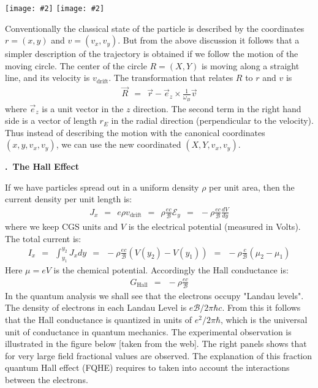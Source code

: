 \documentclass[onecolumn,fleqn, 11pt]{revtex4}
\newcommand{\putgraphv}[2][0.30\hsize]{\texttt{[image: \#2]}}
\newcommand{\beq}{\begin{eqnarray}}
\newcommand{\eeq}{\end{eqnarray}}
\renewcommand{\thesubsection}{\arabic{subsection}}
\renewcommand{\thesubsubsection}{\arabic{subsubsection}}
\newcommand{\sheadC}[1]
{
\addtocounter{subsubsection}{1}
\vspace{5mm}
{\bf \thesubsection.\thesubsubsection \ #1}  
\nopagebreak
\phantomsection
}
\begin{document}
\begin{center}
\putgraphv[0.25\hsize]{Cycloid} 
\putgraphv[0.25\hsize]{CycloidR} 
\end{center}




Conventionally the classical state of the particle 
is described by the coordinates ${r=(x,y)}$
and ${v=(v_x,v_y)}$. 
But from the above discussion it follows that a simpler 
description of the trajectory is obtained if we follow 
the motion of the moving circle. 
The center of the circle ${R=(X,Y)}$ 
is moving along a straight line, 
and its velocity is ${v_{\mbox{drift}}}$. 
The transformation that relates $R$ 
to ${r}$ and ${v}$ is 
\beq
\vec{R} \ \ = \ \ \vec{r} - \vec{e}_z \times \frac{1}{\omega_B}\vec{v}
\eeq
where $\vec{e}_z$ is a unit vector in the $z$ direction.
The second term in the right hand side is 
a vector of length $r_E$ in the radial direction 
(perpendicular to the velocity).
Thus instead of describing the motion with the canonical 
coordinates ${(x,y,v_x,v_y)}$, we can use 
the new coordinated ${(X,Y,v_x,v_y)}$.




\sheadC{The Hall Effect} 

If we have particles spread out in a uniform 
density ${\rho}$ per unit area, then  
the current density per unit length is:
\beq
J_x \ \ = \ \ e \rho v_{\mbox{drift}} 
\ \ = \ \ \rho \frac{ec}{\mathcal{B}}\mathcal{E}_y 
\ \ = \ \ - \rho \frac{ec}{\mathcal{B}} \frac{dV}{dy} 
\eeq
where we keep CGS units and $V$ is the electrical potential (measured in Volts). 
The total current is:
\beq
I_x \ \ = \ \ \int_{y_1}^{y_2} J_x dy 
\ \ = \ \ - \rho \frac{ec}{\mathcal{B}} ( V(y_2) - V(y_1) ) 
\ \ = \ \ - \rho \frac{c}{\mathcal{B}} ( \mu_2 - \mu_1 )
\eeq
Here $\mu=eV$ is the chemical potential.
Accordingly the Hall conductance is:
\beq
G_{\mbox{Hall}} \ \ = \ \ - \rho \frac{ec}{\mathcal{B}} 
\eeq
In the quantum analysis we shall see that the electrons 
occupy "Landau levels". The density of electrons 
in each Landau Level is ${{e\mathcal{B}}/{2\pi\hbar c}}$. 
From this it follows that the Hall conductance is quantized 
in units of ${e^2/{2\pi\hbar}}$, which is the universal 
unit of conductance in quantum mechanics. 
The experimental observation is illustrated in the 
figure below [taken from the web]. The right panels shows 
that for very large field fractional values are observed.
The explanation of this fraction quantum Hall effect (FQHE) 
requires to taken into account the interactions between the electrons.  
  
\end{document}

